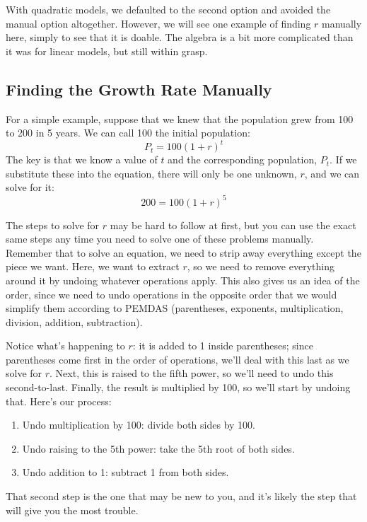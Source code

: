With quadratic models, we defaulted to the second option and avoided the manual option altogether.  However, we will see one example of finding $r$ manually here, simply to see that it is doable.  The algebra is a bit more complicated than it was for linear models, but still within grasp.

\subsection{Finding the Growth Rate Manually}

For a simple example, suppose that we knew that the population grew from 100 to 200 in 5 years.  We can call 100 the initial population:
\[P_t = 100(1+r)^t\]
The key is that we know a value of $t$ and the corresponding population, $P_t$.  If we substitute these into the equation, there will only be one unknown, $r$, and we can solve for it:
\[200 = 100(1+r)^5\]

The steps to solve for $r$ may be hard to follow at first, but you can use the exact same steps any time you need to solve one of these problems manually.\\

Remember that to solve an equation, we need to strip away everything except the piece we want.  Here, we want to extract $r$, so we need to remove everything around it by undoing whatever operations apply.  This also gives us an idea of the order, since we need to undo operations in the opposite order that we would simplify them according to PEMDAS (parentheses, exponents, multiplication, division, addition, subtraction).

Notice what's happening to $r$: it is added to 1 inside parentheses; since parentheses come first in the order of operations, we'll deal with this last as we solve for $r$.  Next, this is raised to the fifth power, so we'll need to undo this second-to-last.  Finally, the result is multiplied by 100, so we'll start by undoing that.  Here's our process:
\begin{enumerate}
\item Undo multiplication by 100: divide both sides by 100.
\item Undo raising to the 5th power: take the 5th root of both sides.
\item Undo addition to 1: subtract 1 from both sides.
\end{enumerate}

That second step is the one that may be new to you, and it's likely the step that will give you the most trouble.
\pagebreak

